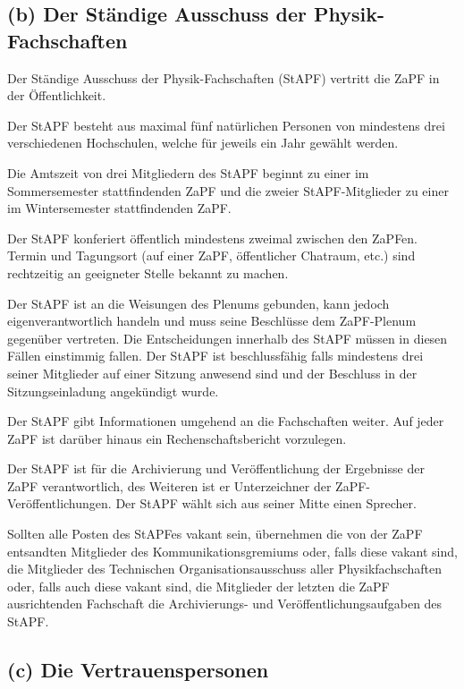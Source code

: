 \documentclass[12pt,oneside]{scrartcl}
\begin{document}
\subsection{(b) Der Ständige Ausschuss der Physik-Fachschaften%
  \label{b-der-standige-ausschuss-der-physik-fachschaften}%
}

Der Ständige Ausschuss der Physik-Fachschaften (StAPF) vertritt die ZaPF in der
Öffentlichkeit.

Der StAPF besteht aus maximal fünf natürlichen Personen von mindestens drei
verschiedenen Hochschulen, welche für jeweils ein Jahr gewählt werden.

Die Amtszeit von drei Mitgliedern des StAPF beginnt zu einer im Sommersemester
stattfindenden ZaPF und die zweier StAPF-Mitglieder zu einer im Wintersemester
stattfindenden ZaPF.

Der StAPF konferiert öffentlich mindestens zweimal zwischen den ZaPFen.
Termin und Tagungsort (auf einer ZaPF, öffentlicher Chatraum, etc.) sind
rechtzeitig an geeigneter Stelle bekannt zu machen.

Der StAPF ist an die Weisungen des Plenums gebunden, kann jedoch
eigenverantwortlich handeln und muss seine Beschlüsse dem ZaPF-Plenum gegenüber
vertreten.
Die Entscheidungen innerhalb des StAPF müssen in diesen Fällen einstimmig fallen.
Der StAPF ist beschlussfähig falls mindestens drei seiner Mitglieder auf einer
Sitzung anwesend sind und der Beschluss in der Sitzungseinladung angekündigt
wurde.

Der StAPF gibt Informationen umgehend an die Fachschaften weiter.
Auf jeder ZaPF ist darüber hinaus ein Rechenschaftsbericht vorzulegen.

Der StAPF ist für die Archivierung und Veröffentlichung der Ergebnisse der ZaPF
verantwortlich, des Weiteren ist er Unterzeichner der ZaPF-Veröffentlichungen.
Der StAPF wählt sich aus seiner Mitte einen Sprecher.

Sollten alle Posten des StAPFes vakant sein, übernehmen die von der ZaPF
entsandten Mitglieder des Kommunikationsgremiums oder, falls diese vakant sind,
die Mitglieder des Technischen Organisationsausschuss aller Physikfachschaften
oder, falls auch diese vakant sind, die Mitglieder der letzten die ZaPF
ausrichtenden Fachschaft die Archivierungs- und Veröffentlichungsaufgaben des
StAPF.


\subsection{(c) Die Vertrauenspersonen%
  \label{c-die-vertrauenspersonen}%
}
\end{document}

